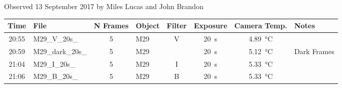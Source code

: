 \caption{Observed 13 September 2017 by Miles Lucas and John Brandon}
\begin{tabular}{clclcccl}
	\hline
	Time  & File             & N Frames & Object & Filter &     Exposure     &       Camera Temp.        & Notes       \\ \hline\hline
	20:55 & M29\_V\_20s\_    &    5     & M29    &   V    & \SI{20}{\second} & \SI{4.89}{\degreeCelsius} &             \\
	20:59 & M29\_dark\_20s\_ &    5     & M29    &        & \SI{20}{\second} & \SI{5.12}{\degreeCelsius} & Dark Frames \\
	21:04 & M29\_I\_20s\_    &    5     & M29    &   I    & \SI{20}{\second} & \SI{5.33}{\degreeCelsius} &             \\
	21:06 & M29\_B\_20s\_    &    5     & M29    &   B    & \SI{20}{\second} & \SI{5.33}{\degreeCelsius} &             \\ \hline
\end{tabular}
